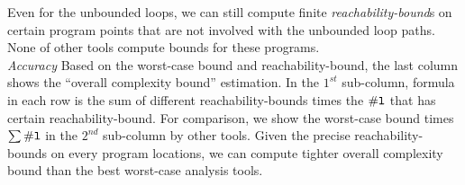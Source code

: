 Even for the unbounded loops, we can still compute finite \emph{reachability-bound}s on certain program points that are not involved with the unbounded loop paths.
None of other tools compute bounds for these programs.
\\
\emph{Accuracy}
Based on the worst-case bound and reachability-bound, the last column shows the ``overall complexity bound'' estimation.
In the $1^{st}$ sub-column, formula in each row is the sum of different reachability-bounds times the $\mathtt{\# l}$ that has certain reachability-bound.
For comparison, we show the worst-case bound times $\sum\mathtt{\# l}$ in the $2^{nd}$ sub-column by other tools. Given the precise reachability-bounds on every program locations, we can compute tighter overall complexity bound than the best worst-case analysis tools.
%
